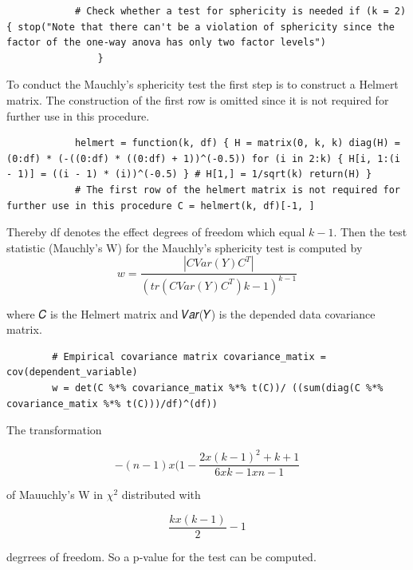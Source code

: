 \documentclass[11pt]{article}
\begin{document}
		\begin{lstlisting}
			# Check whether a test for sphericity is needed if (k = 2) { stop("Note that there can't be a violation of sphericity since the factor of the one-way anova has only two factor levels") 
				}
		\end{lstlisting}
		
		To conduct the Mauchly's sphericity test the first step is to construct a Helmert matrix. The construction of the first row is omitted since it is not required for further use in this procedure.\\
		
		\begin{lstlisting}
			helmert = function(k, df) { H = matrix(0, k, k) diag(H) = (0:df) * (-((0:df) * ((0:df) + 1))^(-0.5)) for (i in 2:k) { H[i, 1:(i - 1)] = ((i - 1) * (i))^(-0.5) } # H[1,] = 1/sqrt(k) return(H) }
			# The first row of the helmert matrix is not required for further use in this procedure C = helmert(k, df)[-1, ]
		\end{lstlisting}
		
		Thereby df denotes the effect degrees of freedom which equal $k - 1$. Then the test statistic (Mauchly's W) for the Mauchly's sphericity test is computed by\\
		
		\begin{equation}
		w = \frac{|CVar(Y)C^T|}{(tr(C Var(Y)C^T)k-1)^{k-1}}
		\end{equation}
			
		where 𝐶 is the Helmert matrix and 𝑉𝑎𝑟(𝑌) is the depended data covariance matrix.
		
		\begin{lstlisting}
		# Empirical covariance matrix covariance_matix = cov(dependent_variable)
		w = det(C %*% covariance_matix %*% t(C))/ ((sum(diag(C %*% covariance_matix %*% t(C)))/df)^(df))
		\end{lstlisting}
		
		The transformation 
		
		\begin{equation}
			-(n-1)x(1-\frac{2x(k-1)^2+k+1}{6 x k-1 x n-1}
		\end{equation}
		
		of Mauuchly's W in $\chi^2$ distributed with
		
		\begin{equation}
			\frac{k  x (k-1)}{2}-1
		\end{equation}
		
		degrrees of freedom. So a p-value for the test can be computed.
		
\end{document}
